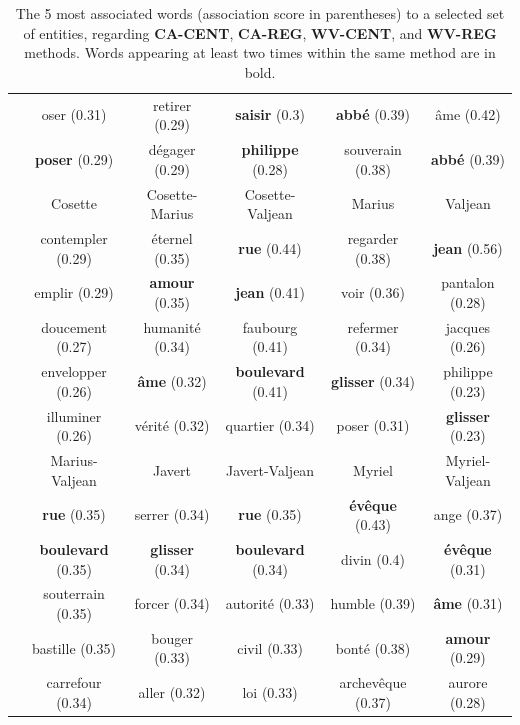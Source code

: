 \documentclass[
twocolumn,
]{ceurart}
\begin{document}
\begin{table}[!h]
\begin{tabular}{|c|c|c|c|c|c|}
		& oser (0.31) & retirer (0.29) & \textbf{saisir} (0.3) & \textbf{abbé} (0.39) & âme (0.42) \\
		& \textbf{poser} (0.29) & dégager (0.29) & \textbf{philippe} (0.28) & souverain (0.38) & \textbf{abbé} (0.39) \\
		\hline
		\hline
		\parbox[t]{2mm}{} & Cosette & Cosette-Marius & Cosette-Valjean & Marius & Valjean \\ 
		& contempler (0.29) & éternel (0.35) & \textbf{rue} (0.44) & regarder (0.38) & \textbf{jean} (0.56) \\
		& emplir (0.29) & \textbf{amour} (0.35) & \textbf{jean} (0.41) & voir (0.36) & pantalon (0.28) \\
		& doucement (0.27) & humanité (0.34) & faubourg (0.41) & refermer (0.34) & jacques (0.26) \\
		& envelopper (0.26) & \textbf{âme} (0.32) & \textbf{boulevard} (0.41) & \textbf{glisser} (0.34) & philippe (0.23) \\
		& illuminer (0.26) & vérité (0.32) & quartier (0.34) & poser (0.31) & \textbf{glisser} (0.23) \\ 
		& Marius-Valjean & Javert & Javert-Valjean & Myriel & Myriel-Valjean \\
		& \textbf{rue} (0.35) & serrer (0.34) & \textbf{rue} (0.35) & \textbf{évêque} (0.43) & ange (0.37) \\
		& \textbf{boulevard} (0.35) & \textbf{glisser} (0.34) & \textbf{boulevard} (0.34) & divin (0.4) & \textbf{évêque} (0.31) \\
		& souterrain (0.35) & forcer (0.34) & autorité (0.33) & humble (0.39) & \textbf{âme} (0.31) \\
		& bastille (0.35) & bouger (0.33) & civil (0.33) & bonté (0.38) & \textbf{amour} (0.29) \\
		& carrefour (0.34) & aller (0.32) & loi (0.33) & archevêque (0.37) & aurore (0.28) \\
		\hline
	\end{tabular}
	
	\label{word_vs_obj}
	\caption{The 5 most associated words (association score in parentheses) to a selected set of entities, regarding \textbf{CA-CENT}, \textbf{CA-REG}, \textbf{WV-CENT}, and \textbf{WV-REG} methods. Words appearing at least two times within the same method are in bold.}
\end{table}
	
\end{document}

